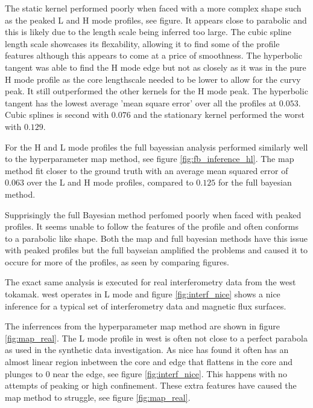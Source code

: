 The static kernel performed poorly when faced with a more complex shape such as the peaked L and H mode profiles, see figure. It appears close to parabolic and this is likely due to the length scale being inferred too large. The cubic spline length scale showcases its flexability, allowing it to find some of the profile features although this appears to come at a price of smoothness. The hyperbolic tangent was able to find the H mode edge but not as closely as it was in the pure H mode profile as the core lengthscale needed to be lower to allow for the curvy peak. It still outperformed the other kernels for the H mode peak. The hyperbolic tangent has the lowest average 'mean square error' over all the profiles at $0.053$. Cubic splines is second with $0.076$ and the stationary kernel performed the worst with $0.129$.



For the H and L mode profiles the full bayessian analysis performed similarly well to the hyperparameter \gls{map} method, see figure \ref{fig:fb_inference_hl}. The \gls{map} method fit closer to the ground truth with an average mean squared error of $0.063$ over the L and H mode profiles, compared to $0.125$ for the full bayesian method.  


Supprisingly the full Bayesian method perfomed poorly when faced with peaked profiles. It seems unable to follow the features of the profile and often conforms to a parabolic like shape. Both the \gls{map} and full bayesian methods have this issue with peaked profiles but the full bayseian amplified the problems and caused it to occure for more of the profiles, as seen by comparing figures.


The exact same analysis is executed for real interferometry data from the \gls{west} tokamak. \gls{west} operates in L mode and figure \ref{fig:interf_nice} shows a \gls{nice} inference for a typical set of interferometry data and magnetic flux surfaces. 



The inferrences from the hyperparameter \gls{map} method are shown in figure \ref{fig:map_real}. The L mode profile in \gls{west} is often not close to a perfect parabola as used in the synthetic data investigation. As \gls{nice} has found it often has an almost linear region inbetween the core and edge that flattens in the core and plunges to 0 near the edge, see figure \ref{fig:interf_nice}. This happens with no attempts of peaking or high confinement. These extra features have caused the \gls{map} method to struggle, see figure \ref{fig:map_real}. 





